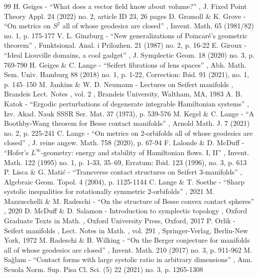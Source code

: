 \begin{thebibliography}{99}
 H. Geiges - “What does a vector field know about volume?” , J. Fixed Point Theory Appl. 24 (2022) no. 2, article ID 23, 26 pages
 D. Gromoll \& K. Grove - “On metrics on $S^{2}$ all of whose geodesics are closed” , Invent. Math. 65 (1981/82) no. 1, p. 175-177
 V. L. Ginzburg - “New generalizations of Poincaré’s geometric theorem” , Funktsional. Anal. i Prilozhen. 21 (1987) no. 2, p. 16-22
 E. Giroux - “Ideal Liouville domains, a cool gadget” , J. Symplectic Geom. 18 (2020) no. 3, p. 769-790
 H. Geiges \& C. Lange - “Seifert fibrations of lens spaces” , Abh. Math. Sem. Univ. Hamburg 88 (2018) no. 1, p. 1-22, Correction: Ibid. 91 (2021), no. 1, p. 145–150
 M. Jankins \& W. D. Neumann - Lectures on Seifert manifolds , Brandeis Lect. Notes , vol. 2 , Brandeis University, Waltham, MA, 1983
 A. B. Katok - “Ergodic perturbations of degenerate integrable Hamiltonian systems” , Izv. Akad. Nauk SSSR Ser. Mat. 37 (1973), p. 539-576
 M. Kegel \& C. Lange - “A Boothby-Wang theorem for Besse contact manifolds” , Arnold Math. J. 7 (2021) no. 2, p. 225-241
 C. Lange - “On metrics on 2-orbifolds all of whose geodesics are closed” , J. reine angew. Math. 758 (2020), p. 67-94
 F. Lalonde \& D. McDuff - “Hofer’s $L^\infty $-geometry: energy and stability of Hamiltonian flows. I, II” , Invent. Math. 122 (1995) no. 1, p. 1-33, 35–69, Erratum: Ibid. 123 (1996), no. 3, p. 613
 P. Lisca \& G. Matić - “Transverse contact structures on Seifert 3-manifolds” , Algebraic Geom. Topol. 4 (2004), p. 1125-1144
 C. Lange \& T. Soethe - “Sharp systolic inequalities for rotationally symmetric $2$-orbifolds” , 2021
 M. Mazzucchelli \& M. Radeschi - “On the structure of Besse convex contact spheres” , 2020
 D. McDuff \& D. Salamon - Introduction to symplectic topology , Oxford Graduate Texts in Math. , Oxford University Press, Oxford, 2017
 P. Orlik - Seifert manifolds , Lect. Notes in Math. , vol. 291 , Springer-Verlag, Berlin-New York, 1972
 M. Radeschi \& B. Wilking - “On the Berger conjecture for manifolds all of whose geodesics are closed” , Invent. Math. 210 (2017) no. 3, p. 911-962
 M. Sağlam - “Contact forms with large systolic ratio in arbitrary dimensions” , Ann. Scuola Norm. Sup. Pisa Cl. Sci. (5) 22 (2021) no. 3, p. 1265-1308

\end{thebibliography}
